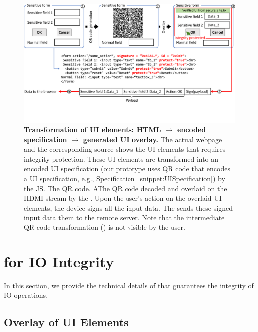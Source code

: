 \begin{figure}[t]
\centering
\includegraphics[trim={0 2cm 0 0}, clip, width=\linewidth]{chapters/ProtectIOn/images/formTransform.pdf}
\caption[Transformation of UI elements: HTML $\rightarrow$ encoded specification $\rightarrow$ \device generated UI overlay]{\textbf{Transformation of UI elements: HTML $\rightarrow$ encoded specification $\rightarrow$ \device generated UI overlay.} \one The actual webpage and the corresponding \html source shows the UI elements that requires integrity protection. \two These UI elements are transformed into an encoded UI specification (our \name prototype uses QR code that encodes a UI specification, e.g., Specification~\ref{snippet:UISpecification}) by the \name JS. The QR code. \three AThe QR code decoded and overlaid on the HDMI stream by the \device. \four Upon the user's action on the overlaid UI elements, the device signs all the input data. \five The \device sends these signed input data them to the remote server. Note that the intermediate QR code transformation (\two) is not visible by the user.}
\spacesave
\label{fig:transformation}
\end{figure}

\section{\name for IO Integrity}
\label{sec:protection}

In this section, we provide the technical details of \name that guarantees the integrity of IO operations.


\subsection{\device Overlay of UI Elements}
\label{sec:systemDesign:transformation}

